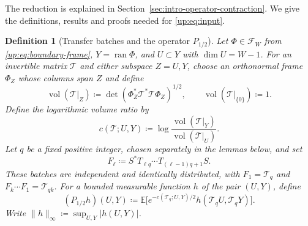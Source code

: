 \documentclass[11pt]{article}
\numberwithin{equation}{section}
\newtheorem{definition}[theorem]{Definition}
\theoremstyle{remark}
\newcommand{\E}{\mathbb E}
\newcommand{\ran}{\operatorname{ran}}
\begin{document}
The reduction is explained in Section~\ref{sec:intro-operator-contraction}.
We give the definitions, results and proofs needed for \eqref{up:eq:input}.

\begin{definition}[Transfer batches and the operator $P_{1/2}$]
\label{up:def:transfer-operator}
Let $\Phi\in\mathcal F_W$ from \eqref{up:eq:boundary-frame},
$Y=\ran\Phi$, and $U\subset Y$ with $\dim U=W-1$.
For an invertible matrix $\mathcal T$ and either subspace $Z=U,Y$,
choose an orthonormal frame $\Phi_Z$
whose columns span $Z$ and define
\[
 \operatorname{vol}(\mathcal T|_Z)\coloneqq
       \det(\Phi_Z^*\mathcal T^*\mathcal T\Phi_Z)^{1/2},\qquad
 \operatorname{vol}(\mathcal T|_{\{0\}})\coloneqq1.
\]
Define the logarithmic volume ratio by
\begin{equation}\label{eq:c-volume-cocycle}
 c(\mathcal T;U,Y)\coloneqq
 \log\frac{\operatorname{vol}(\mathcal T|_Y)}{\operatorname{vol}(\mathcal T|_U)}.
\end{equation}
Let $q$ be a fixed positive integer, chosen separately in the lemmas
below, and set
\begin{equation}\label{up:eq:transfer-batches}
 F_\ell\coloneqq S^*T_{\ell q}\cdots T_{(\ell-1)q+1}S.
\end{equation}
These batches are independent and identically distributed, with
$F_1=\mathcal T_q$ and $F_k\cdots F_1=\mathcal T_{qk}$.
For a bounded measurable function $h$ of the pair $(U,Y)$, define
\begin{equation}\label{cc:eq:Ps}
 (P_{1/2}h)(U,Y)\coloneqq
 \E\bigl[e^{-c(\mathcal T_q;U,Y)/2}
       h(\mathcal T_q U,\mathcal T_q Y)\bigr].
\end{equation}
Write $\|h\|_\infty\coloneqq\sup_{U,Y}|h(U,Y)|$.
\end{definition}
\end{document}
